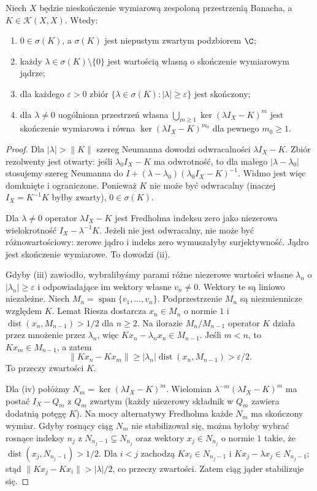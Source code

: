 \begin{twierdzenie}
\label{thm:riesz-schauder30}
Niech $X$ będzie nieskończenie wymiarową zespoloną
przestrzenią Banacha, a $K\in\mathcal K(X,X)$.
Wtedy:
\begin{enumerate}[label=\textup{(\roman*)}]
\item $0\in\sigma(K)$, a $\sigma(K)$ jest niepustym
zwartym podzbiorem $\C$;
\item każdy $\lambda\in\sigma(K)\setminus\{0\}$ jest
wartością własną o skończenie wymiarowym jądrze;
\item dla każdego $\varepsilon>0$ zbiór
$\{\lambda\in\sigma(K):|\lambda|\ge\varepsilon\}$
jest skończony;
\item dla $\lambda\ne0$ uogólniona przestrzeń własna
$\bigcup_{m\ge1}\ker(\lambda I_X-K)^m$ jest
skończenie wymiarowa i równa
$\ker(\lambda I_X-K)^{m_0}$ dla pewnego $m_0\ge1$.
\end{enumerate}
\end{twierdzenie}
\begin{proof}
Dla $|\lambda|>\|K\|$ szereg Neumanna dowodzi
odwracalności $\lambda I_X-K$. Zbiór rezolwenty jest otwarty:
jeśli $\lambda_0 I_X-K$ ma odwrotność, to dla małego
$|\lambda-\lambda_0|$ stosujemy szereg Neumanna do
$I+(\lambda-\lambda_0)(\lambda_0 I_X-K)^{-1}$.
Widmo jest więc domknięte i ograniczone. Ponieważ
$K$ nie może być odwracalny (inaczej
$I_X=K^{-1}K$ byłby zwarty), $0\in\sigma(K)$.

Dla $\lambda\ne0$ operator $\lambda I_X-K$ jest Fredholma
indeksu zero jako niezerowa wielokrotność $I_X-\lambda^{-1}K$.
Jeżeli nie jest odwracalny, nie może być różnowartościowy:
zerowe jądro i indeks zero wymuszałyby surjektywność.
Jądro jest skończenie wymiarowe. To dowodzi (ii).

Gdyby (iii) zawiodło, wybralibyśmy parami różne
niezerowe wartości własne $\lambda_n$ o
$|\lambda_n|\ge\varepsilon$ i odpowiadające im wektory
własne $v_n\ne0$. Wektory te są liniowo niezależne.
Niech $M_n=\operatorname{span}\{v_1,\ldots,v_n\}$.
Podprzestrzenie $M_n$ są niezmiennicze względem $K$.
Lemat Riesza dostarcza $x_n\in M_n$ o normie $1$ i
$\operatorname{dist}(x_n,M_{n-1})>1/2$ dla $n\ge2$.
Na ilorazie $M_n/M_{n-1}$ operator $K$ działa przez
mnożenie przez $\lambda_n$, więc
$Kx_n-\lambda_nx_n\in M_{n-1}$. Jeśli $m<n$,
to $Kx_m\in M_{n-1}$, a zatem
\[\|Kx_n-Kx_m\|\ge
|\lambda_n|\operatorname{dist}(x_n,M_{n-1})>\varepsilon/2.\]
To przeczy zwartości $K$.

Dla (iv) połóżmy $N_m=\ker(\lambda I_X-K)^m$.
Wielomian $\lambda^{-m}(\lambda I_X-K)^m$ ma postać
$I_X-Q_m$ z $Q_m$ zwartym (każdy niezerowy składnik
w $Q_m$ zawiera dodatnią potęgę $K$). Na mocy
alternatywy Fredholma każde $N_m$ ma skończony wymiar.
Gdyby rosnący ciąg $N_m$ nie stabilizował się, można
byłoby wybrać rosnące indeksy $n_j$ z
$N_{n_j-1}\subsetneq N_{n_j}$ oraz wektory
$x_j\in N_{n_j}$ o normie $1$ takie, że
$\operatorname{dist}(x_j,N_{n_j-1})>1/2$.
Dla $i<j$ zachodzą $Kx_i\in N_{n_j-1}$ i
$Kx_j-\lambda x_j\in N_{n_j-1}$; stąd
$\|Kx_j-Kx_i\|>|\lambda|/2$, co przeczy zwartości.
Zatem ciąg jąder stabilizuje się.
\end{proof}

